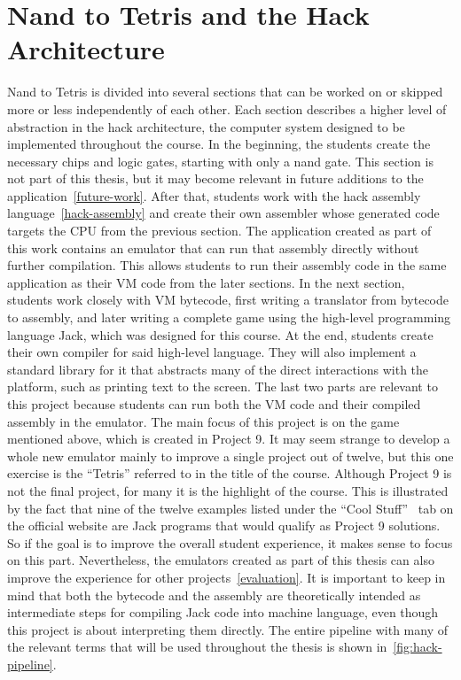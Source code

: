 \section{Nand to Tetris and the Hack Architecture} \label{hack-architecture}
Nand to Tetris is divided into several sections that can be worked on or skipped more or less independently of each other.
Each section describes a higher level of abstraction in the hack architecture, the computer system designed to be implemented throughout the course.
In the beginning, the students create the necessary chips and logic gates, starting with only a nand gate.
This section is not part of this thesis, but it may become relevant in future additions to the application~\ref{future-work}.
After that, students work with the hack assembly language~\ref{hack-assembly} and create their own assembler whose generated code targets the CPU from the previous section.
The application created as part of this work contains an emulator that can run that assembly directly without further compilation.
This allows students to run their assembly code in the same application as their VM code from the later sections.
In the next section, students work closely with VM bytecode, first writing a translator from bytecode to assembly, and later writing a complete game using the high-level programming language Jack, which was designed for this course.
At the end, students create their own compiler for said high-level language.
They will also implement a standard library for it that abstracts many of the direct interactions with the platform, such as printing text to the screen.
The last two parts are relevant to this project because students can run both the VM code and their compiled assembly in the emulator.
The main focus of this project is on the game mentioned above, which is created in Project 9.
It may seem strange to develop a whole new emulator mainly to improve a single project out of twelve, but this one exercise is the ``Tetris'' referred to in the title of the course.
Although Project 9 is not the final project, for many it is the highlight of the course.
This is illustrated by the fact that nine of the twelve examples listed under the ``Cool Stuff''~\cite{n2tweb} tab on the official website are Jack programs that would qualify as Project 9 solutions.
So if the goal is to improve the overall student experience, it makes sense to focus on this part.
Nevertheless, the emulators created as part of this thesis can also improve the experience for other projects~\ref{evaluation}.
It is important to keep in mind that both the bytecode and the assembly are theoretically intended as intermediate steps for compiling Jack code into machine language, even though this project is about interpreting them directly.
The entire pipeline with many of the relevant terms that will be used throughout the thesis is shown in~\cref{fig:hack-pipeline}.

